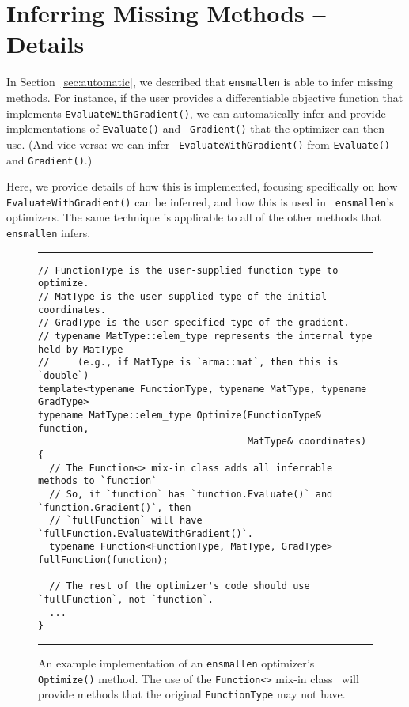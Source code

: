 \section{Inferring Missing Methods -- Details}
\label{sec:automatic_details}

In Section~\ref{sec:automatic}, we described that {\tt ensmallen} is able to
infer missing methods.  For instance, if the user provides a differentiable
objective function that implements {\tt EvaluateWithGradient()}, we can
automatically infer and provide implementations of {\tt Evaluate()} and {\tt
Gradient()} that the optimizer can then use.  (And vice versa: we can infer {\tt
EvaluateWithGradient()} from {\tt Evaluate()} and {\tt Gradient()}.)

Here, we provide details of how this is implemented, focusing specifically on
how {\tt EvaluateWithGradient()} can be inferred, and how this is used in {\tt
ensmallen}'s optimizers.  The same technique is applicable to all of the other
methods that {\tt ensmallen} infers.

\begin{figure}[b!]
\hrule
\vspace{1ex}
\begin{verbatim}
// FunctionType is the user-supplied function type to optimize.
// MatType is the user-supplied type of the initial coordinates.
// GradType is the user-specified type of the gradient.
// typename MatType::elem_type represents the internal type held by MatType
//     (e.g., if MatType is `arma::mat`, then this is `double`)
template<typename FunctionType, typename MatType, typename GradType>
typename MatType::elem_type Optimize(FunctionType& function,
                                     MatType& coordinates)
{ 
  // The Function<> mix-in class adds all inferrable methods to `function`
  // So, if `function` has `function.Evaluate()` and `function.Gradient()`, then
  // `fullFunction` will have `fullFunction.EvaluateWithGradient()`.
  typename Function<FunctionType, MatType, GradType> fullFunction(function);
  
  // The rest of the optimizer's code should use `fullFunction`, not `function`.
  ...
}
\end{verbatim}
\hrule
\vspace*{-0.5em}
\caption{An example implementation of an {\tt ensmallen} optimizer's
{\tt Optimize()} method.
The use of the {\tt Function<>} mix-in class~\cite{smaragdakis2000mixin}
will provide methods that the original {\tt FunctionType} may not have.
}
\label{fig:ex_optimize}
\end{figure}

